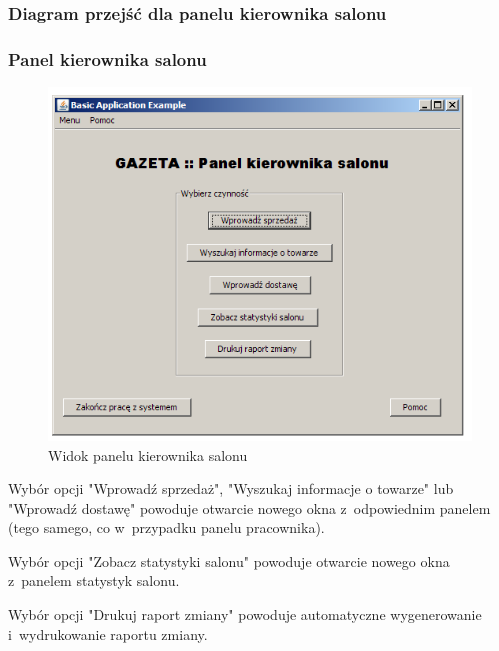 \subsubsection{Diagram przejść dla panelu kierownika salonu}
\clearpage
\subsubsection{Panel kierownika salonu}
\begin{figure}[h]
\includegraphics[width=1\textwidth]{gfx/kierownik.png}
\caption{Widok panelu kierownika salonu}
\end{figure}
Wybór opcji "Wprowadź sprzedaż", "Wyszukaj informacje o towarze" lub "Wprowadź dostawę" powoduje otwarcie nowego okna z~odpowiednim panelem (tego samego, co w~przypadku panelu pracownika).

Wybór opcji "Zobacz statystyki salonu" powoduje otwarcie nowego okna z~panelem statystyk salonu.

Wybór opcji "Drukuj raport zmiany" powoduje automatyczne wygenerowanie i~wydrukowanie raportu zmiany.
\clearpage
